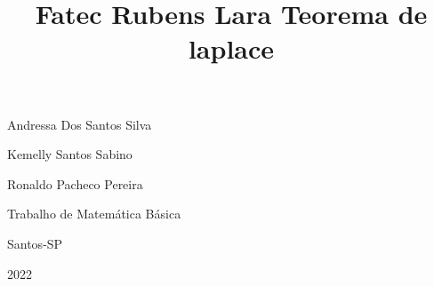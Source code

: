 \documentclass[11pt]{article}
\title{Fatec Rubens Lara }
\date{}
\begin{document}
    
    \maketitle
    
    
\vspace{4}
    
    \begin{center}
                                  
                          Andressa Dos Santos Silva
\end{center}
\linespread{0.5}

    \begin{center}
        
    
                          Kemelly Santos Sabino
\end{center}
\linespread{1.0}
    \begin{center}
        
    
                          Ronaldo Pacheco Pereira
\end{center}

    \vspace{2cm}
\linespread{2.3}

\begin{center}
    

                            Trabalho de Matemática Básica
            \vspace{1cm}
        \linespread{1cm}
                            

   \end{center} 
      \linespread{2}  
      \vspace{4cm}
\begin{center}
    Santos-SP
\end{center}

\vspace{0.5}
\begin{center}
    2022 
\end{center}
  
\title{Teorema de laplace}
\end{document}
